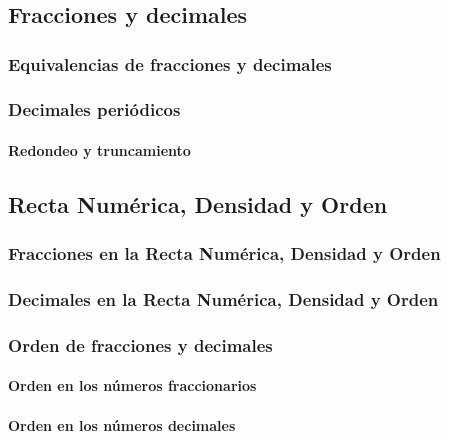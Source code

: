 \documentclass[11pt]{book}
\begin{document}
\pagestyle{empty}

\restoregeometry
{}
\tableofcontents
\newpage
\chapter{}
\pagestyle{fancy}
\newpage
\thispagestyle{empty}
\section{Fracciones y decimales}
\subsection{Equivalencias de fracciones y decimales}
\subsection{Decimales peri\'odicos}
\subsubsection{Redondeo y truncamiento}

\newpage \thispagestyle{plain}

\section{Recta Num\'erica, Densidad y Orden}
\subsection{Fracciones en la Recta Num\'erica, Densidad y Orden}
\subsection{Decimales en la Recta Num\'erica, Densidad y Orden}
\subsection{Orden de fracciones y decimales}
\subsubsection{Orden en los n\'umeros fraccionarios}
\subsubsection{Orden en los n\'umeros decimales}
\end{document}
